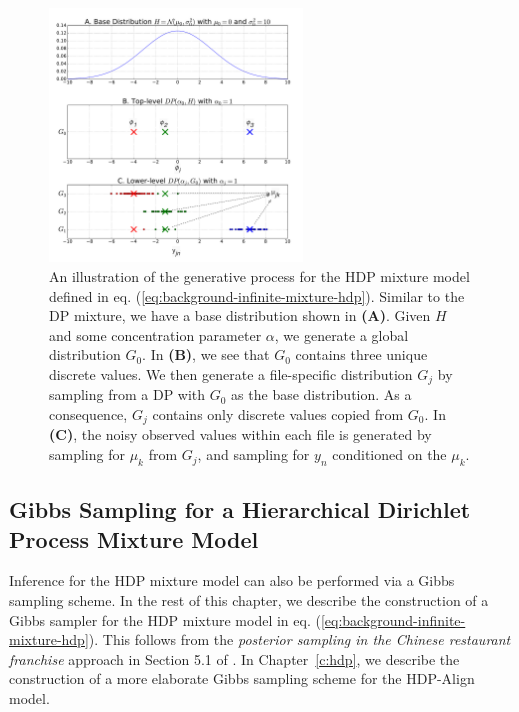 \begin{figure}
\noindent \begin{centering}
\includegraphics[width=0.6\textwidth]{03-machine-learning/figures/hdp_samples.pdf}
\par\end{centering}
\caption[An illustration of the generative process for the HDP mixture model defined in eq. (\ref{eq:background-infinite-mixture-hdp}).]{\label{fig:g-from-hdp}An illustration of the generative process for the HDP mixture model defined in eq. (\ref{eq:background-infinite-mixture-hdp}). Similar to the DP mixture, we have a base distribution shown in \textbf{(A)}. Given $H$ and some concentration parameter $\alpha$, we generate a global distribution $G_0$. In \textbf{(B)}, we see that $G_0$ contains three unique discrete values. We then generate a file-specific distribution $G_j$ by sampling from a DP with $G_0$ as the base distribution. As a consequence, $G_j$ contains only discrete values copied from $G_0$. In \textbf{(C)}, the noisy observed values within each file is generated by sampling for $\mu_k$ from $G_j$, and sampling for $y_n$ conditioned on the $\mu_k$.}
\end{figure}

\subsection{Gibbs Sampling for a Hierarchical Dirichlet Process Mixture Model}

Inference for the HDP mixture model can also be performed via a Gibbs sampling scheme. In the rest of this chapter, we describe the construction of a Gibbs sampler for the HDP mixture model in eq. (\ref{eq:background-infinite-mixture-hdp}). This follows from the \emph{posterior sampling in the Chinese restaurant franchise} approach in Section 5.1 of \cite{teh2012hierarchical}. In Chapter~\ref{c:hdp}, we describe the construction of a more elaborate Gibbs sampling scheme for the HDP-Align model.

